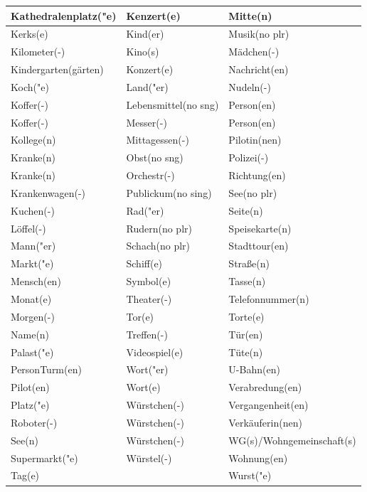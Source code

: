 \documentclass{article}
\begin{document}
\begin{table}[h!]
\begin{tabular}{|>{\raggedright\arraybackslash}p{5cm}|>{\raggedright\arraybackslash}p{5cm}|>{\raggedright\arraybackslash}p{5cm}|}
        Kathedralenplatz("e) & Kenzert(e) & Mitte(n) \\\hline
        Kerks(e) & Kind(er) & Musik(no plr) \\\hline
        Kilometer(-) & Kino(s) & Mädchen(-) \\\hline
        Kindergarten(gärten) & Konzert(e) & Nachricht(en) \\\hline
        Koch("e) & Land("er) & Nudeln(-) \\\hline
        Koffer(-) & Lebensmittel(no sng) & Person(en) \\\hline
        Koffer(-) & Messer(-) & Person(en) \\\hline
        Kollege(n) & Mittagessen(-) & Pilotin(nen) \\\hline
        Kranke(n) & Obst(no sng) & Polizei(-) \\\hline
        Kranke(n) & Orchestr(-) & Richtung(en) \\\hline
        Krankenwagen(-) & Publickum(no sing) & See(no plr) \\\hline
        Kuchen(-) & Rad("er) & Seite(n) \\\hline
        Löffel(-) & Rudern(no plr) & Speisekarte(n) \\\hline
        Mann("er) & Schach(no plr) & Stadttour(en) \\\hline
        Markt("e) & Schiff(e) & Stra\ss{}e(n) \\\hline
        Mensch(en) & Symbol(e) & Tasse(n) \\\hline
        Monat(e) & Theater(-) & Telefonnummer(n) \\\hline
        Morgen(-) & Tor(e) & Torte(e) \\\hline
        Name(n) & Treffen(-) & Tür(en) \\\hline
        Palast("e) & Videospiel(e) & Tüte(n) \\\hline
        PersonTurm(en) & Wort("er) & U-Bahn(en) \\\hline
        Pilot(en) & Wort(e) & Verabredung(en) \\\hline
        Platz("e) & Würstchen(-) & Vergangenheit(en) \\\hline
        Roboter(-) & Würstchen(-) & Verkäuferin(nen) \\\hline
        See(n) & Würstchen(-) & WG(s)/Wohngemeinschaft(s) \\\hline
        Supermarkt("e) & Würstel(-) & Wohnung(en) \\\hline
        Tag(e) &  & Wurst("e) \\\hline

\end{tabular}
\end{table}
\end{document}
